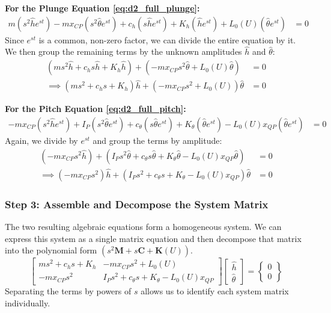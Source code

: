 \documentclass{article}
\begin{document}
\noindent\textbf{For the Plunge Equation \eqref{eq:d2_full_plunge}:}
\begin{align*}
    m(s^2\hat{h}e^{st}) - mx_{CP}(s^2\hat{\theta}e^{st}) + c_h(s\hat{h}e^{st}) + K_h(\hat{h}e^{st}) + L_0(U)(\hat{\theta}e^{st}) &= 0
\end{align*}
Since $e^{st}$ is a common, non-zero factor, we can divide the entire equation by it. We then group the remaining terms by the unknown amplitudes $\hat{h}$ and $\hat{\theta}$:
\begin{align*}
    (ms^2\hat{h} + c_h s\hat{h} + K_h\hat{h}) + (-mx_{CP}s^2\hat{\theta} + L_0(U)\hat{\theta}) &= 0 \\
    \implies (ms^2 + c_h s + K_h)\hat{h} + (-mx_{CP}s^2 + L_0(U))\hat{\theta} &= 0
\end{align*}

\noindent\textbf{For the Pitch Equation \eqref{eq:d2_full_pitch}:}
\begin{align*}
    -mx_{CP}(s^2\hat{h}e^{st}) + I_P(s^2\hat{\theta}e^{st}) + c_\theta(s\hat{\theta}e^{st}) + K_\theta(\hat{\theta}e^{st}) - L_0(U)x_{QP}(\hat{\theta}e^{st}) &= 0
\end{align*}
Again, we divide by $e^{st}$ and group the terms by amplitude:
\begin{align*}
    (-mx_{CP}s^2\hat{h}) + (I_Ps^2\hat{\theta} + c_\theta s\hat{\theta} + K_\theta\hat{\theta} - L_0(U)x_{QP}\hat{\theta}) &= 0 \\
    \implies (-mx_{CP}s^2)\hat{h} + (I_Ps^2 + c_\theta s + K_\theta - L_0(U)x_{QP})\hat{\theta} &= 0
\end{align*}

\subsubsection{Step 3: Assemble and Decompose the System Matrix}
The two resulting algebraic equations form a homogeneous system. We can express this system as a single matrix equation and then decompose that matrix into the polynomial form $(s^2\mathbf{M} + s\mathbf{C} + \mathbf{K}(U))$.
\begin{equation*}
\begin{bmatrix}
ms^2 + c_h s + K_h & -mx_{CP}s^2 + L_0(U) \\
-mx_{CP}s^2 & I_Ps^2 + c_\theta s + K_\theta - L_0(U)x_{QP}
\end{bmatrix}
\begin{bmatrix} \hat{h} \\ \hat{\theta} \end{bmatrix}
=
\begin{Bmatrix} 0 \\ 0 \end{Bmatrix}
\end{equation*}
Separating the terms by powers of $s$ allows us to identify each system matrix individually.
\end{document}
